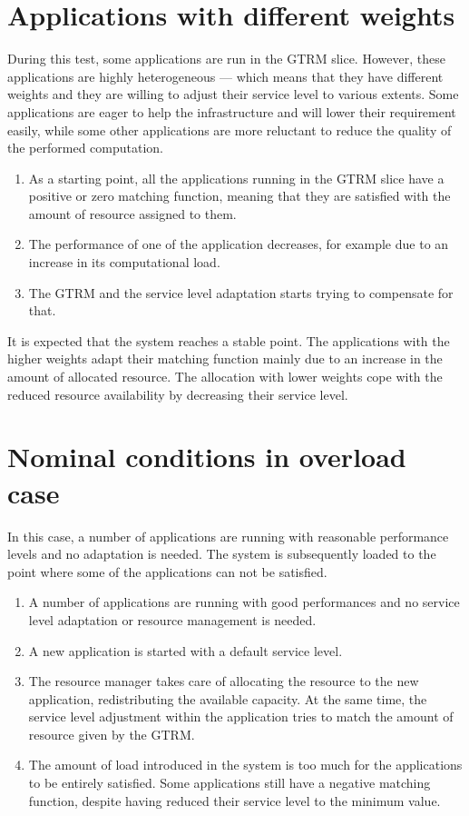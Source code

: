 \documentclass[nobiblatex]{LTHthesis}
\begin{document}
\section{Applications with different weights}

During this test, some applications are run in the GTRM slice. However, these
applications are highly heterogeneous --- which means that they have different
weights and they are willing to adjust their service level to various extents.
Some applications are eager to help the infrastructure and will lower their
requirement easily, while some other applications are more reluctant to
reduce the quality of the performed computation.

\begin{enumerate}
\item As a starting point, all the applications running in the GTRM slice
  have a positive or zero matching function, meaning that they are satisfied
  with the amount of resource assigned to them.
\item The performance of one of the application decreases, for example due to
  an increase in its computational load.
\item The GTRM and the service level adaptation starts trying to compensate
  for that.
\end{enumerate}


It is expected that the system reaches a stable point. The applications with
the higher weights adapt their matching function mainly due to an increase
in the amount of allocated resource. The allocation with lower weights cope
with the reduced resource availability by decreasing their service level.

\section{Nominal conditions in overload case}

In this case, a number of applications are running with reasonable
performance levels and no adaptation is needed. The system is subsequently
loaded to the point where some of the applications can not be satisfied.

\begin{enumerate}
\item A number of applications are running with good performances and 
  no service level adaptation or resource management is needed.
\item A new application is started with a default service level.
\item The resource manager takes care of allocating the resource to the
  new application, redistributing the available capacity. At the same
  time, the service level adjustment within the application tries to match
  the amount of resource given by the GTRM.
\item The amount of load introduced in the system is too much for the
  applications to be entirely satisfied. Some applications still have a 
  negative matching function, despite having reduced their service
  level to the minimum value.
\end{enumerate}
\end{document}
